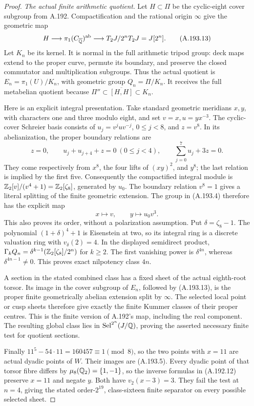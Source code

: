 \begin{proof}
\emph{The actual finite arithmetic quotient.}
Let \(H\subset\Pi\) be the cyclic-eight cover subgroup from
A.192.  Compactification and the rational origin \(\infty\)
give the geometric map
\[
 H\longrightarrow\pi_1(C_{\overline{\mathbb Q}})^{\rm ab}
       \longrightarrow T_2J/2^nT_2J=J[2^n].
\tag{A.193.13}
\]
Let \(K_n\) be its kernel.  It is normal in the full arithmetic
tripod group: deck maps extend to the proper curve, permute its
boundary, and preserve the closed commutator and multiplication
subgroups.  Thus the actual quotient is
\(E_n=\pi_1(U)/K_n\), with geometric group \(Q_n=\Pi/K_n\).
It receives the full metabelian quotient because
\(\Pi''\subset\overline{[H,H]}\subset K_n\).

Here is an explicit integral presentation.  Take standard
geometric meridians \(x,y\), with characters one and three
modulo eight, and set \(v=x,u=yx^{-3}\).
The cyclic-cover Schreier basis consists of
\(u_j=v^juv^{-j}\), \(0\leq j<8\), and \(z=v^8\).
In its abelianization, the proper boundary relations are
\[
 z=0,\qquad u_j+u_{j+4}+z=0\ (0\leq j<4),
       \qquad\sum_{j=0}^7u_j+3z=0.
\tag{A.193.14}
\]
They come respectively from \(x^8\), the four lifts of
\((xy)^2\), and \(y^8\); the last relation is implied by
the first five.  Consequently the compactified integral
module is
\(\mathbb Z_2[v]/(v^4+1)=\mathbb Z_2[\zeta_8]\), generated by \(u_0\).
The boundary relation \(v^8=1\) gives a literal splitting
of the finite geometric extension.  The group in (A.193.4)
therefore has the explicit map
\[
                    x\longmapsto v,\qquad
                    y\longmapsto u_0v^3.
\tag{A.193.15}
\]
This also proves its order, without a polarization assumption.
Put \(\delta=\zeta_8-1\).  The polynomial
\((1+\delta)^4+1\) is Eisenstein at two, so its integral
ring is a discrete valuation ring with
\(v_\delta(2)=4\).  In the displayed semidirect product,
\(\Gamma_kQ_n=\delta^{k-1}(\mathbb Z_2[\zeta_8]/2^n)\)
for \(k\geq2\).  The first vanishing power is
\(\delta^{4n}\), whereas \(\delta^{4n-1}\ne0\).
This proves exact nilpotency class \(4n\).

A section in the stated combined class has a fixed sheet
of the actual eighth-root torsor.  Its image in the cover
subgroup of \(E_n\), followed by (A.193.13), is the proper
finite geometrically abelian extension split by \(\infty\).
The selected local point or cusp sheets therefore give exactly
the finite Kummer classes of their proper centres.  This is
the finite version of A.192's map, including the real component.
The resulting global class lies in
\(\operatorname{Sel}^{2^n}(J/\mathbb Q)\), proving the asserted
necessary finite test for quotient sections.

Finally \(11^5-54\cdot11=160457\equiv1\pmod8\), so the
two points with \(x=11\) are actual dyadic points of \(W\).
Their images are (A.193.5).  Every dyadic point of that
torsor fibre differs by \(\mu_8(\mathbb Q_2)=\{1,-1\}\), so the
inverse formulas in (A.192.12) preserve \(x=11\) and negate
\(y\).  Both have \(v_2(x-3)=3\).  They fail the test at
\(n=4\), giving the stated order-\(2^{19}\), class-sixteen
finite separator on every possible selected sheet.
\end{proof}
